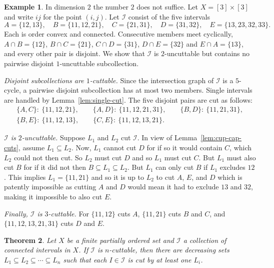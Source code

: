 \documentclass[10pt, a4paper]{article}
\theoremstyle{plain}
\newtheorem{theorem}{Theorem}[section]
\theoremstyle{definition}
\newtheorem{example}[theorem]{Example}
\newcommand{\I}{\mathcal{I}}
\begin{document}
\begin{example}\label{ex:pentagon}
  In dimension $2$ the number $2$ does not suffice. Let $X=[3]\times[3]$ and write
  $ij$ for the point $(i,j)$. Let $\I$ consist of the five intervals
  \[
    A=\{12,13\},\quad B=\{11,12,21\},\quad C=\{21,31\},\quad D=\{31,32\},\quad
    E=\{13,23,32,33\}.
  \]
  Each is order convex and connected. Consecutive members meet cyclically,
  $A\cap B=\{12\}$, $B\cap C=\{21\}$, $C\cap D=\{31\}$, $D\cap E=\{32\}$ and
  $E\cap A=\{13\}$, and every other pair is disjoint. We show that $\I$ is
  $2$-uncuttable but contains no pairwise disjoint $1$-uncuttable subcollection.

  \emph{Disjoint subcollections are $1$-cuttable.} Since the intersection graph of
  $\I$ is a $5$-cycle, a pairwise disjoint subcollection has at most two members.
  Single intervals are handled by Lemma~\ref{lem:single-cut}. The five disjoint
  pairs are cut as follows:
  \begin{gather*}
    \{A,C\}:\ \{11,12,21\},\qquad
    \{A,D\}:\ \{11,12,21,31\},\qquad
    \{B,D\}:\ \{11,21,31\},\\
    \{B,E\}:\ \{11,12,13\},\qquad
    \{C,E\}:\ \{11,12,13,21\}.
  \end{gather*}

  \emph{$\I$ is $2$-uncuttable.}
  Suppose $L_1$ and $L_2$ cut $\I$. In view of Lemma~\ref{lem:cup-cap-cuts}, assume
  $L_1 \subseteq L_2$. Now, $L_1$ cannot cut $D$ for if so it would contain $C$,
  which $L_2$ could not then cut.
  So $L_2$ must cut $D$ and so $L_1$ must cut $C$. But $L_1$ must also cut $B$
  for if it did not then $B\subseteq L_1\subseteq L_2$. But $L_1$ can only cut $B$
  if $L_1$ excludes $12$. This implies $L_1 = \{11, 21\}$ and so it
  is up to $L_2$ to cut $A$, $E$, and $D$ which is  patently impossible as cutting
  $A$ and $D$ would mean it had to exclude $13$ and $32$, making it impossible to
  also cut $E$.

  \emph{Finally, $\I$ is $3$-cuttable.} For $\{11,12\}$ cuts $A$, $\{11,21\}$ cuts $B$ and $C$,
  and $\{11,12,13,21,31\}$ cuts $D$ and $E$.
\end{example}

\begin{theorem}\label{thm:nested-cuts}
  Let $X$ be a finite partially ordered set and $\I$ a collection of connected
  intervals in $X$. If $\I$ is $n$-cuttable, then there are decreasing sets
  $L_1\subseteq L_2\subseteq\cdots\subseteq L_n$ such that each $I\in\I$ is cut by at
  least one $L_i$.
\end{theorem}
\end{document}
